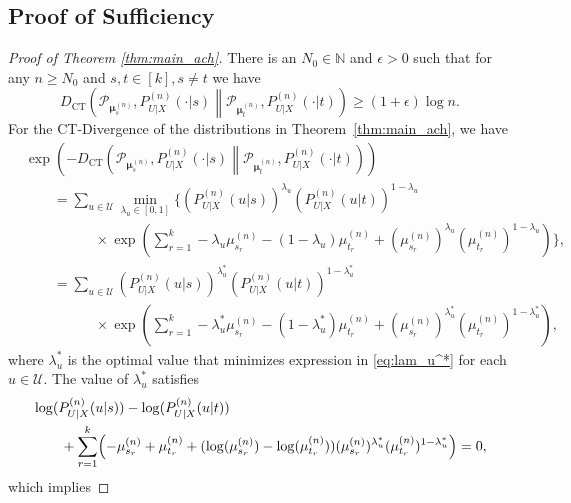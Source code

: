 \documentclass[11pt]{article}
\theoremstyle{plain}
\theoremstyle{definition}
\begin{document}
\subsection{Proof of Sufficiency}
\label{sub:suff}
\begin{proof}[Proof of Theorem \ref{thm:main_ach}]
There is an $N_0 \in \mathbb{N}$ and  $\epsilon > 0$ 
such that
for any $n \ge N_0$ and $s,t \in [k], s \neq t$ we have
\begin{equation}
	D_{\mathrm{CT}}\left(\mathcal{P}_{\bm{\mu}_s^{(n)}}, P^{(n)}_{U|X}(\cdot|s)  \middle\|  \mathcal{P}_{\bm{\mu}_t^{(n)}}, P^{(n)}_{U|X}(\cdot|t) \right)
\ge (1 + \epsilon) \log n. \label{eq: first_ineq}
\end{equation}
For the CT-Divergence of the  distributions in Theorem~\ref{thm:main_ach}, we have
\begin{align}
& \exp\left(-D_{\mathrm{CT}}\left( \mathcal{P}_{\bm{\mu}_s^{(n)}}, P^{(n)}_{U|X}(\cdot|s)   \middle\|  \mathcal{P}_{\bm{\mu}_t^{(n)}}, P^{(n)}_{U|X}(\cdot|t) \right) \right) \nonumber \\
& \quad \quad = 
\sum_{u \in \mathcal{U}}
 \min_{\lambda_u \in [0,1]} \Biggl\{(P^{(n)}_{U|X}(u|s))^{\lambda_u}
 (P^{(n)}_{U|X}(u|t))^{1- \lambda_u} 
 \nonumber\\
& \quad\quad\quad\quad\quad \times \exp\left(
 \sum_{r=1}^k  -\lambda_u \mu_{s_r}^{(n)} - 
(1-\lambda_u) \mu_{t_r}^{(n)}  + (\mu_{s_r}^{(n)})^{\lambda_u} (\mu_{t_r}^{(n)})^{1-\lambda_u}
\right)\Biggr\},
\label{eq:lam_u^*} \\
& \quad \quad =
\sum_{u \in \mathcal{U}}
 (P^{(n)}_{U|X}(u|s))^{\lambda_u^*}  
 (P^{(n)}_{U|X}(u|t))^{1-\lambda_u^*} \nonumber\\
& \quad\quad\quad\quad\quad \times \exp\left(
 \sum_{r=1}^k  -\lambda_u^* \mu_{s_r}^{(n)} - 
(1-\lambda_u^*) \mu_{t_r}^{(n)}  + (\mu_{s_r}^{(n)})^{\lambda_u^*} (\mu_{t_r}^{(n)})^{1-\lambda_u^*}
\right),
\label{eq:lam_u^*-v2} 
\end{align}
where $\lambda_u^*$ is the optimal value that minimizes expression in \eqref{eq:lam_u^*} for each $u \in \mathcal{U}$. 
The value of $\lambda_u^*$ satisfies
\begin{align}
& \log(P^{(n)}_{U|X}(u|s))-\log(P^{(n)}_{U|X}(u|t)) \nonumber \\
& \quad\quad + \sum_{r=1}^k \Bigl(
-\mu_{s_r}^{(n)} + \mu_{t_r}^{(n)}
+ (\log(\mu_{s_r}^{(n)}) - \log(\mu_{t_r}^{(n)}))
(\mu_{s_r}^{(n)})^{\lambda_u^*} (\mu_{t_r}^{(n)})^{1-\lambda_u^*}
\Bigr)=0,
\label{eq:diff_lam}
\end{align}
which implies

\end{proof}
\end{document}
